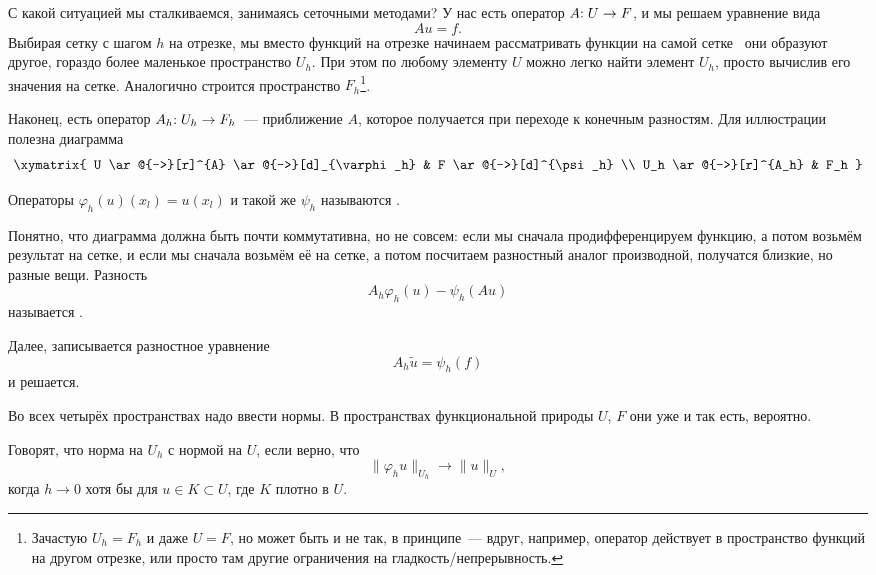 \documentclass{trlnotes}
\begin{document}
    С какой ситуацией мы сталкиваемся, занимаясь сеточными методами? У нас есть оператор $A\text{\text{:}} \; U \to F$, и мы решаем уравнение вида
    \[
        Au = f.
    \]
    Выбирая сетку с шагом $h$ на отрезке, мы вместо функций на отрезке начинаем рассматривать функции на самой сетке~ они образуют другое, гораздо более маленькое пространство $U_h$. При этом по любому элементу $U$ можно легко найти элемент $U_h$, просто вычислив его значения на сетке. Аналогично строится пространство $F_h$\footnote{Зачастую $U_h = F_h$ и даже $U = F$, но может быть и не так, в принципе~--- вдруг, например, оператор действует в пространство функций на другом отрезке, или просто там другие ограничения на гладкость/непрерывность.}.

    Наконец, есть оператор $A_h \text{\text{:}} \; U_h \to F_h$~--- приближение $A$, которое получается при переходе к конечным разностям. Для иллюстрации полезна диаграмма
    \[
        \xymatrix{
            U \ar@{->}[r]^{A} \ar@{->}[d]_{\varphi_h} & F \ar@{->}[d]^{\psi_h} \\ U_h \ar@{->}[r]^{A_h} & F_h
        }
    \]
    \begin{de}
        Операторы $\varphi_h(u)(x_l) = u(x_l)$ и такой же $\psi_h$ называются .
    \end{de}

    \begin{rem}
        Понятно, что диаграмма должна быть почти коммутативна, но не совсем: если мы сначала продифференцируем функцию, а потом возьмём результат на сетке, и если мы сначала возьмём её на сетке, а потом посчитаем разностный аналог производной, получатся близкие, но разные вещи. Разность
        \[
            A_h\varphi_h(u) - \psi_h(Au)
        \]
         называется .
    \end{rem}

    Далее, записывается разностное уравнение
    \[
        A_h \tilde{u} = \psi_h(f)
    \]
    и решается.

    Во всех четырёх пространствах надо ввести нормы. В пространствах функциональной природы $U$, $F$ они уже и так есть, вероятно.

    \begin{de}
        Говорят, что норма на $U_h$  с нормой на $U$, если верно, что 
        \[
            \|\varphi_h u\|_{U_h} \to \|u\|_U,
        \]
        когда $h \to 0$ хотя бы для $u \in K \subset U$, где $K$ плотно в $U$.

    \end{de}
\end{document}
